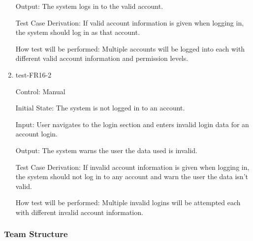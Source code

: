 \documentclass[12pt, titlepage]{article}
\begin{document}
\begin{enumerate}
  Output: The system logs in to the valid account.

  Test Case Derivation: If valid account information is given when logging in,
  the system should log in as that account.

  How test will be performed: Multiple accounts will be logged into each with
  different valid account information and permission levels.

  \item{test-FR16-2\\}

  Control: Manual

  Initial State: The system is not logged in to an account.

  Input: User navigates to the login section and enters invalid login data
  for an account login.

  Output: The system warns the user the data used is invalid.

  Test Case Derivation: If invalid account information is given when logging
  in, the system should not log in to any account and warn the user the data
  isn't valid.

  How test will be performed: Multiple invalid logins will be attempted each
  with different invalid account information.








\end{enumerate}

\subsubsection{Team Structure}
\end{document}
